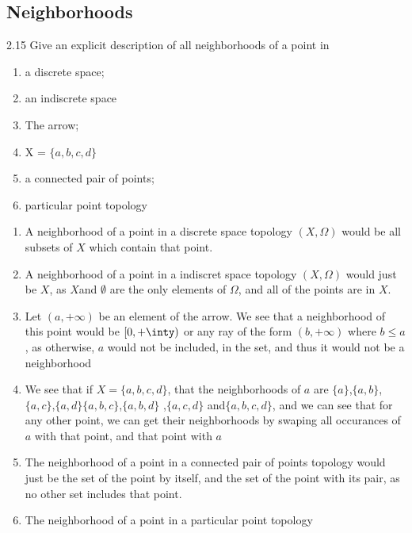 \subsection{Neighborhoods}
2.15 Give an explicit description of all neighborhoods of a point in
\begin{enumerate}
\item a discrete space;
\item an indiscrete space
\item The arrow;
\item X = $\{a,b,c,d\}$
\item a connected pair of points;
\item particular point topology
\end{enumerate}

\begin{enumerate}
  \item A neighborhood of a point in a discrete space topology $(X,\Omega)$ would
    be all subsets of $X$ which contain that point.
  \item A neighborhood of a point in a indiscret space topology
    $(X,\Omega)$ would just be $X$, as $X$and $\emptyset$ are the only
    elements of $\Omega$, and all of the points are in $X$.
  \item Let $(a,+\infty)$ be an element of the arrow. We see that a
    neighborhood of this point would be $[0,+\inty)$ or any ray of the form
    $(b,+\infty)$ where $b\leq a$, as otherwise, $a$ would not be
    included, in the set, and thus it would not be a neighborhood
  \item We see that if $X = \{a,b,c,d\}$, that the neighborhoods of
    $a$ are
    $\{a\}$,$\{a,b\}$,$\{a,c\}$,$\{a,d\}$$\{a,b,c\}$,$\{a,b,d\}$
    ,$\{a,c,d\}$  and$\{a,b,c,d\}$, and we can see that for any other
    point, we can get their neighborhoods by swaping all occurances of
    $a$ with that point, and that point with $a$
  \item The neighborhood of a point in a connected pair of points
    topology would just be the set of the point by itself, and the set
    of the point with its pair, as no other set includes that point.
  \item The neighborhood of a point in a particular point topology
\end{enumerate}
